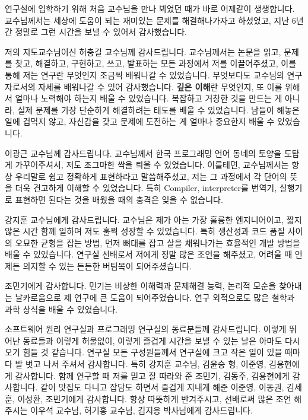\begin{acknowledgement}
  연구실에 입학하기 위해 처음 교수님을 만나 뵈었던 때가 바로 어제같이 생생합니다. 교수님께서는 세상에 도움이 되는 재미있는 문제를 해결해나가자고 하셨었고, 지난 6년간 정말로 그런 시간을 보낼 수 있어서 감사했습니다.

  저의 지도교수님이신 허충길 교수님께 감사드립니다.
  교수님께서는 논문을 읽고, 문제를 찾고, 해결하고, 구현하고, 쓰고, 발표하는 모든 과정에서 저를 이끌어주셨고, 이를 통해 저는 연구란 무엇인지 조금씩 배워나갈 수 있었습니다.
  무엇보다도 교수님의 연구자로서의 자세를 배워나갈 수 있어 감사했습니다.
  \textbf{깊은 이해}란 무엇인지, 또 이를 위해서 얼마나 노력해야 하는지 배울 수 있었습니다.
  복잡하고 거창한 것을 만드는 게 아니라, 실제 문제를 가장 단순하게 해결하려는 태도를 배울 수 있었습니다.
  남들이 해놓은 일에 겁먹지 않고, 자신감을 갖고 문제에 도전하는 게 얼마나 중요한지 배울 수 있었습니다.

  이광근 교수님께 감사드립니다.
  교수님께서 한국 프로그래밍 언어 동네의 토양을 도탑게 가꾸어주셔서, 저도 조그마한 싹을 틔울 수 있었습니다.
  이를테면, 교수님께서는 항상 우리말로 쉽고 정확하게 표현하라고 말씀해주셨고, 저는 그 과정에서 각 단어의 뜻을 더욱 견고하게 이해할 수 있었습니다.
  특히 Compiler, interpreter를 번역기, 실행기로 표현하면 된다는 것을 배웠을 때의 충격은 잊을 수 없습니다.

  강지훈 교수님에게 감사드립니다.
  교수님은 제가 아는 가장 훌륭한 엔지니어이고, 짧지 않은 시간 함께 일하며 저도 훌쩍 성장할 수 있었습니다. 
  특히 생산성과 코드 품질 사이의 오묘한 균형을 잡는 방법, 먼저 뼈대를 잡고 살을 채워나가는 효율적인 개발 방법을 배울 수 있었습니다.
  연구실 선배로서 저에게 정말 많은 조언을 해주셨고, 어려울 때 언제든 의지할 수 있는 든든한 버팀목이 되어주셨습니다.

  조민기에게 감사합니다.
  민기는 비상한 이해력과 문제해결 능력, 논리적 모순을 찾아내는 날카로움으로 제 연구에 큰 도움이 되어주었습니다.
  연구 외적으로도 많은 철학과 과학 상식을 배울 수 있었습니다.

  소프트웨어 원리 연구실과 프로그래밍 연구실의 동료분들께 감사드립니다.
  이렇게 뛰어난 동료들과 이렇게 허물없이, 이렇게 즐겁게 시간을 보낼 수 있는 날은 아마도 다시 오기 힘들 것 같습니다.
  연구실 모든 구성원들께서 연구실에 크고 작은 일이 있을 때마다 발 벗고 나서 주셔서 감사합니다. 특히 강지훈 교수님, 김윤승 형, 이준영, 김용현에게 감사합니다.
  함께 연구할 때 저를 믿고 잘 따라와 준 조민기, 김동주, 김용현에게 감사합니다.
  같이 맛집도 다니고 잡담도 하면서 즐겁게 지내게 해준 이준영, 이동권, 김세훈, 이성환, 조민기에게 감사합니다.
  항상 따뜻하게 반겨주시고, 선배로써 많은 조언 해주시는 이우석 교수님, 허기홍 교수님, 김지응 박사님에게 감사드립니다.


\end{acknowledgement}
